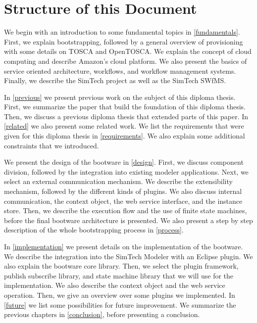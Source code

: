 \section{Structure of this Document}

We begin with an introduction to some fundamental topics in \autoref{fundamentals}.
First, we explain bootstrapping, followed by a general overview of provisioning with some details on TOSCA and OpenTOSCA.
We explain the concept of cloud computing and describe Amazon's cloud platform.
We also present the basics of service oriented architecture, workflows, and workflow management systems.
Finally, we describe the SimTech project as well as the SimTech SWfMS.

In \autoref{previous} we present previous work on the subject of this diploma thesis.
First, we summarize the paper that build the foundation of this diploma thesis.
Then, we discuss a previous diploma thesis that extended parts of this paper.
In \autoref{related} we also present some related work.
We list the requirements that were given for this diploma thesis in \autoref{requirements}.
We also explain some additional constraints that we introduced.

We present the design of the bootware in \autoref{design}.
First, we discuss component division, followed by the integration into existing modeler applications.
Next, we select an external communication mechanism.
We describe the extensibility mechanism, followed by the different kinds of plugins.
We also discuss internal communication, the context object, the web service interface, and the instance store.
Then, we describe the execution flow and the use of finite state machines, before the final bootware architecture is presented.
We also present a step by step description of the whole bootstrapping process in \autoref{process}.

In \autoref{implementation} we present details on the implementation of the bootware.
We describe the integration into the SimTech Modeler with an Eclipse plugin.
We also explain the bootware core library.
Then, we select the plugin framework, publish subscribe library, and state machine library that we will use for the implementation.
We also describe the context object and the web service operation.
Then, we give an overview over some plugins we implemented.
In \autoref{future} we list some possibilities for future improvement.
We summarize the previous chapters in \autoref{conclusion}, before presenting a conclusion.
